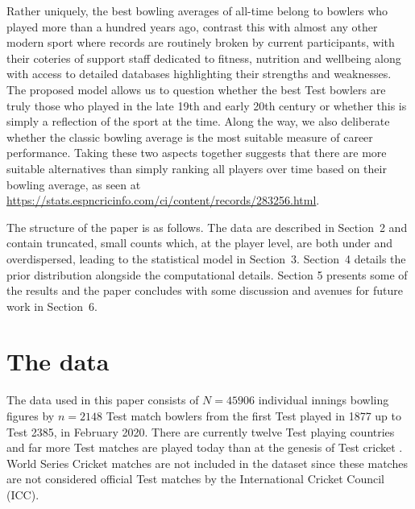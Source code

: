 \documentclass{statsoc}
\newcommand{\pmp}[1]{\textcolor{blue}{#1}}
\newcommand{\numobs}{45906}
\newcommand{\numtestbowlers}{2148}
\newcommand{\finaltestnum}{2385}
\newcommand{\finaltestdate}{February 2020}
\begin{document}
Rather uniquely, the best bowling averages of all-time belong to bowlers who played more than a hundred years ago, contrast this with almost any other modern sport where records are routinely broken by current participants, with their coteries of support staff dedicated to fitness, nutrition and wellbeing along with access to detailed databases highlighting their strengths and weaknesses. The proposed model allows us to question whether the best Test bowlers are truly those who played in the late 19th and early 20th century or whether this is simply a reflection of the sport at the time. Along the way, we also deliberate whether the classic bowling average is the most suitable measure of career performance. Taking these two aspects together suggests that there are more suitable alternatives than simply ranking all players over time based on their bowling average, as seen at 
\url{https://stats.espncricinfo.com/ci/content/records/283256.html}.

The structure of the paper is as follows. The data are described in
Section~2 and contain truncated, small counts which, at the player level, are both under and overdispersed, leading to the statistical model in Section~3. 
Section~4 details the prior distribution alongside the computational details. Section 5 presents some of the results and the paper
concludes with some discussion and avenues for future work in Section~6.

\section{The data}
The data used in this paper consists of $N = \numobs$ individual innings bowling figures by $n=\numtestbowlers$ Test match bowlers from the first Test played in 1877 up to Test \finaltestnum, in \finaltestdate. There are currently twelve Test playing countries and far more Test matches are played today than at the genesis of Test cricket \citep{Boys2019}. World Series Cricket matches are not included in the dataset since these matches are not considered official Test matches by the International Cricket Council (ICC). 
\end{document}
